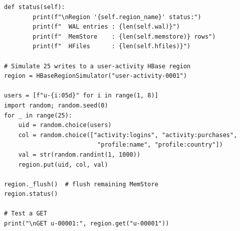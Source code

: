 \begin{lstlisting}[style=pyspark, caption={PE4.3: HBase write path and compaction simulator}]
    def status(self):
        print(f"\nRegion '{self.region_name}' status:")
        print(f"  WAL entries : {len(self.wal)}")
        print(f"  MemStore    : {len(self.memstore)} rows")
        print(f"  HFiles      : {len(self.hfiles)}")

# Simulate 25 writes to a user-activity HBase region
region = HBaseRegionSimulator("user-activity-0001")

users = [f"u-{i:05d}" for i in range(1, 8)]
import random; random.seed(0)
for _ in range(25):
    uid = random.choice(users)
    col = random.choice(["activity:logins", "activity:purchases",
                          "profile:name", "profile:country"])
    val = str(random.randint(1, 1000))
    region.put(uid, col, val)

region._flush()  # flush remaining MemStore
region.status()

# Test a GET
print("\nGET u-00001:", region.get("u-00001"))
\end{lstlisting}
